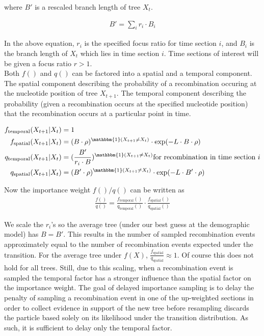 \documentclass{article}
\begin{document}
\noindent where $B'$ is a rescaled branch length of tree $X_t$. 

\begin{align}
B' = \sum_{i} r_i \cdot B_i 
\end{align}

\noindent In the above equation, $r_i$ is the specified focus ratio for time section $i$, and
$B_i$ is the branch length of $X_t$ which lies in time section $i$. Time sections of interest will be
given a focus ratio $r > 1$. \\

\noindent Both $f()$ and $q()$ can be factored into a spatial and a temporal component.
The spatial component describing the probability of a recombination occuring at the nucleotide 
position of tree $X_{t+1}$. The temporal component describing the probability (given a recombination
occurs at the specified nucleotide position) that the recombination occurs at a particular point in time.

\begin{align}
f_{\text{temporal}}(X_{t+1}|X_{t}) &= 1 \\
f_{\text{spatial}}(X_{t+1}|X_{t}) &= (B \cdot \rho)^{\mathbbm{1}(X_{t+1} \neq X_{t})} \cdot \exp(- L \cdot B \cdot \rho) \\
q_{\text{temporal}}(X_{t+1}|X_{t}) &= (\frac {B'} {r_i \cdot B})^{\mathbbm{1}(X_{t+1} \neq X_{t})} \text{for recombination in time section $i$} \\
q_{\text{spatial}}(X_{t+1}|X_{t}) &= (B' \cdot \rho)^{\mathbbm{1}(X_{t+1} \neq X_{t})} \cdot \exp(- L \cdot B' \cdot \rho)
\end{align}

\noindent Now the importance weight $f()/q()$ can be written as
\begin{align}
\frac{f()}{q()} = \frac{ f_{\text{temporal}}() }{ q_{\text{temporal}}() } \cdot \frac{ f_{\text{spatial}}() }{ q_{\text{spatial}}() }
\end{align}

\noindent We scale the $r_i$'s so the average tree (under our best guess at the demographic model)
has $B=B'$. This results in the number of sampled recombination events approximately equal to 
the number of recombination events expected under the transition. For the average tree under $f(X)$,
$\frac{ f_{\text{spatial}} }{ q_{\text{spatial}} } \approx 1$. Of course this does not hold for all trees.
Still, due to this scaling, when a recombination event is sampled the temporal factor has a 
stronger influence than the spatial factor on the importance weight. 
The goal of delayed importance sampling is to delay the penalty of sampling a recombination event
in one of the up-weighted sections in order to collect evidence in support of the new tree 
before resampling discards the particle based solely on its likelihood under the transition distribution. 
As such, it is sufficient to delay only the temporal factor. \\
\end{document}

